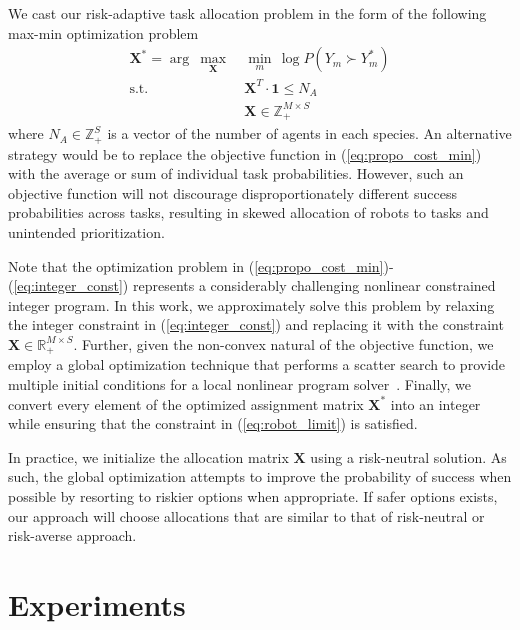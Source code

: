 \documentclass[letterpaper, 10 pt, conference]{ieeeconf}  %
\begin{document}
We cast our risk-adaptive task allocation problem in the form of the following max-min optimization problem
\begin{align}
    \bm{X}^* = \arg\ \max_{\bm{X}} &\ \min_{m} \, \log P(Y_m \succ Y^*_m) \label{eq:propo_cost_min} \\
    \mathrm{s.t.} &\ \bm{X}^T \cdot \bm{1} \leq N_A \label{eq:robot_limit} \\
    &\ \bm{X} \in \mathbb{Z}_+^{M \times S} \label{eq:integer_const}
\end{align}
where $N_A \in \mathbb{Z}_+^S$ is a vector of the number of agents in each species. An alternative strategy would be to replace the objective function in (\ref{eq:propo_cost_min}) with the average or sum of individual task probabilities. However, such an objective function will not discourage disproportionately different success probabilities across tasks, resulting in skewed allocation of robots to tasks and unintended prioritization.

Note that the optimization problem in (\ref{eq:propo_cost_min})-(\ref{eq:integer_const}) represents a considerably challenging nonlinear constrained integer program. In this work, we approximately solve this problem by relaxing the integer constraint in (\ref{eq:integer_const}) and replacing it with the constraint $\bm{X} \in \mathbb{R}_+^{M \times S}$. Further, given the non-convex natural of the objective function, we employ a global optimization technique that performs a scatter search to provide multiple initial conditions for a local nonlinear program solver~\cite{ugray2007scatter}. Finally, we convert every element of the optimized assignment matrix $\bm{X}^*$ into an integer while ensuring that the constraint in (\ref{eq:robot_limit}) is satisfied.

In practice, we initialize the allocation matrix $\bm{X}$ using a risk-neutral solution. As such, the global optimization attempts to improve the probability of success when possible by resorting to riskier options when appropriate. If safer options exists, our approach will choose allocations that are similar to that of risk-neutral or risk-averse approach.

\section{Experiments}
\end{document}
